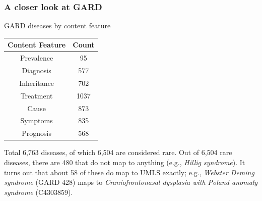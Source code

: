 ﻿\documentclass[anchorcolor=blue,linkcolor=blue]{beamer}
\begin{document}
\begin{frame}
  \frametitle{A closer look at GARD}
    
  \begin{block}{GARD diseases by content feature}
    \begin{center}
      \begin{tabular}{cc}\toprule
        Content Feature & Count\\ \midrule
        Prevalence & 95 \\
        Diagnosis & 577\\
        Inheritance & 702\\
        Treatment & 1037\\
        Cause & 873\\
        Symptoms & 835\\
        Prognosis & 568\\ \bottomrule
      \end{tabular}
    \end{center}
    Total 6,763 diseases, of which 6,504 are considered rare. Out of
    6,504 rare diseases, there are 480 that do not map to anything (e.g.,
    \emph{Hillig syndrome}). It turns out that about 58 of these do map
    to UMLS exactly; e.g., \emph{Webster Deming syndrome} (GARD 428)
    maps to \emph{Craniofrontonasal dysplasia with Poland anomaly
      syndrome} (C4303859).
  \end{block}
\end{frame}
\end{document}
